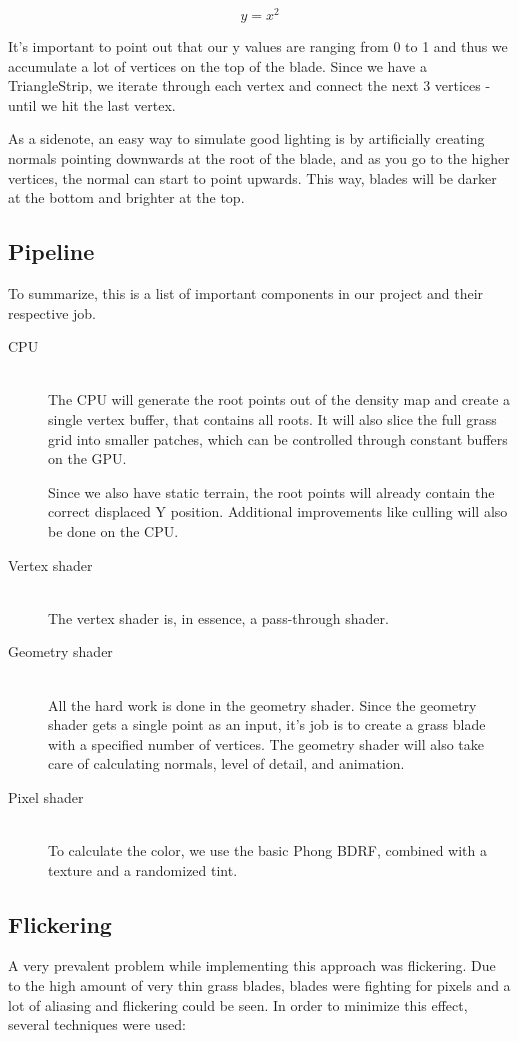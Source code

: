 \documentclass[conference]{acmsiggraph}
\begin{document}
\begin{equation}
y = x^2
\end{equation}

It's important to point out that our y values are ranging from 0 to 1 and thus we accumulate a lot of vertices on the top of the blade. Since we have a TriangleStrip, we iterate through each vertex and connect the next 3 vertices - until we hit the last vertex.

As a sidenote, an easy way to simulate good lighting is by artificially creating normals pointing downwards at the root of the blade, and as you go to the higher vertices, the normal can start to point upwards. This way, blades will be darker at the bottom and brighter at the top.

\subsection{Pipeline}
To summarize, this is a list of important components in our project and their respective job.
\begin{description}
  \item[CPU] \hfill \\
  The CPU will generate the root points out of the density map and create a single vertex buffer, that contains all roots. It will also slice the full grass grid into smaller patches, which can be controlled through constant buffers on the GPU.
  
  Since we also have static terrain, the root points will already contain the correct displaced Y position. Additional improvements like culling will also be done on the CPU.
  \item[Vertex shader] \hfill \\
  The vertex shader is, in essence, a pass-through shader.
  \item[Geometry shader] \hfill \\
  All the hard work is done in the geometry shader. Since the geometry shader gets a single point as an input, it's job is to create a grass blade with a specified number of vertices. The geometry shader will also take care of calculating normals, level of detail, and animation.
  \item[Pixel shader] \hfill \\
  To calculate the color, we use the basic Phong BDRF, combined with a texture and a randomized tint.
\end{description}

\subsection{Flickering}
A very prevalent problem while implementing this approach was flickering. Due to the high amount of very thin grass blades, blades were fighting for pixels and a lot of aliasing and flickering could be seen. In order to minimize this effect, several techniques were used:
\end{document}
